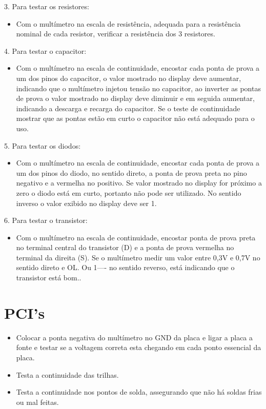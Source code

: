 3. Para testar os resistores:

\begin{itemize}
    \item Com o multímetro na escala de resistência, adequada para a resistência nominal de cada resistor, verificar a resistência dos 3 resistores.
\end{itemize}

4. Para testar o capacitor:

\begin{itemize}
    \item Com o multímetro na escala de continuidade, encostar cada ponta de prova a um dos pinos do capacitor, o valor mostrado no display deve aumentar, indicando que o multímetro injetou tensão no capacitor, ao inverter as pontas de prova o valor mostrado no display deve diminuir e em seguida aumentar, indicando a descarga e recarga do capacitor. Se o teste de continuidade mostrar que as pontas estão em curto o capacitor não está adequado para o uso.
\end{itemize}

5. Para testar os diodos:

\begin{itemize}
    \item Com o multímetro na escala de continuidade, encostar cada ponta de prova a um dos pinos do diodo, no sentido direto, a ponta de prova preta no pino negativo e a vermelha no positivo. Se valor mostrado no display for próximo a zero o diodo está em curto, portanto não pode ser utilizado. No sentido inverso o valor exibido no display deve ser 1.
\end{itemize}

6. Para testar o transistor:

\begin{itemize}
    \item Com o multímetro na escala de continuidade, encostar ponta de prova preta no terminal central do transistor (D) e  a ponta de prova vermelha no terminal da direita (S). Se o multímetro medir um valor entre 0,3V e 0,7V no sentido direto e OL. Ou 1—- no sentido reverso, está indicando que o transistor está bom..
\end{itemize}


\section{PCI's}

\begin{itemize}
    \item Colocar a ponta negativa do multímetro no GND da placa e ligar a placa a fonte e testar se a voltagem correta esta chegando em cada ponto essencial da placa.
    \item Testa a continuidade das trilhas.
    \item Testa a continuidade nos pontos de solda, assegurando que não há soldas frias ou mal feitas.
\end{itemize}